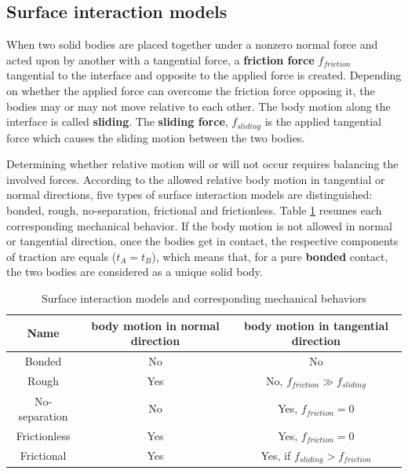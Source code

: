\subsection{Surface interaction models}%

\label{subsection:surfaceinteractionmodels}
When two solid bodies are placed together under a nonzero normal force and acted upon by another with a tangential force, a \textbf{friction force} $f_{friction}$ tangential to the interface and opposite to the applied force is created. Depending on whether the applied force can overcome the friction force opposing it, the bodies may or may not move relative to each other. The body motion along the interface is called \textbf{sliding}. The \textbf{sliding force}, $f_{sliding}$ is the applied tangential force which causes the sliding motion between the two bodies.
  
Determining whether relative motion will or will not occur requires balancing the involved forces. According to the allowed relative body motion in tangential or normal directions, five types of surface interaction models are distinguished: bonded, rough, no-separation, frictional and frictionless. Table \ref{contactB} resumes each corresponding mechanical behavior. If the body motion is not allowed in normal or tangential direction, once the bodies get in contact, the respective components of traction are equals ($t_A=t_B$), which means that, for a pure \textbf{bonded} contact, the two bodies are considered as a unique solid body.    

\begin{table}[H]

\begin{center}
\begin{tabular}{||c|c|c||}
\hline
Name & body motion in normal direction & body motion in tangential direction \\
\hline\hline
Bonded & No & No\\
\hline
Rough & Yes & No, $f_{friction} \gg f_{sliding}$ \\
\hline
No-separation & No & Yes, $f_{friction} = 0$ \\
\hline
Frictionless & Yes & Yes, $f_{friction} = 0$ \\
\hline
Frictional & Yes & Yes, if $f_{sliding} > f_{friction}$\\
\hline
\end{tabular}
\caption{Surface interaction models and corresponding mechanical behaviors}
\label{contactB}
\end{center}
\end{table}

